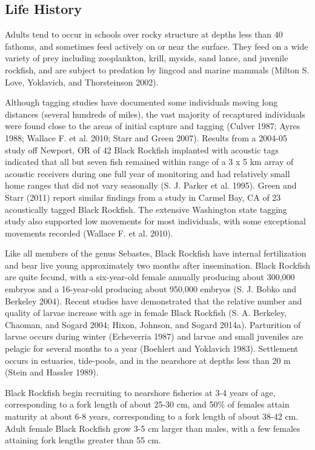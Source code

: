\documentclass[11pt,
  english,
  letterpaper,
]{article}
\begin{document}
\hypertarget{life-history}{%
\subsection{Life History}\label{life-history}}

Adults tend to occur in schools over rocky structure at depths less than 40 fathoms, and sometimes feed actively on or near the surface. They feed on a wide variety of prey including zooplankton, krill, mysids, sand lance, and juvenile rockfish, and are subject to predation by lingcod and marine mammals (Milton S. Love, Yoklavich, and Thorsteinson 2002).

Although tagging studies have documented some individuals moving long distances (several hundreds of miles), the vast majority of recaptured individuals were found close to the areas of initial capture and tagging (Culver 1987; Ayres 1988; Wallace F. et al. 2010; Starr and Green 2007). Results from a 2004-05 study off Newport, OR of 42 Black Rockfish implanted with acoustic tags indicated that all but seven fish remained within range of a 3 x 5 km array of acoustic receivers during one full year of monitoring and had relatively small home ranges that did not vary seasonally (S. J. Parker et al. 1995). Green and Starr (2011) report similar findings from a study in Carmel Bay, CA of 23 acoustically tagged Black Rockfish. The extensive Washington state tagging study also supported low movements for most individuals, with some exceptional movements recorded (Wallace F. et al. 2010).

Like all members of the genus Sebastes, Black Rockfish have internal fertilization and bear live young approximately two months after insemination. Black Rockfish are quite fecund, with a six-year-old female annually producing about 300,000 embryos and a 16-year-old producing about 950,000 embryos (S. J. Bobko and Berkeley 2004). Recent studies have demonstrated that the relative number and quality of larvae increase with age in female Black Rockfish (S. A. Berkeley, Chaoman, and Sogard 2004; Hixon, Johnson, and Sogard 2014a). Parturition of larvae occurs during winter (Echeverria 1987) and larvae and small juveniles are pelagic for several months to a year (Boehlert and Yoklavich 1983). Settlement occurs in estuaries, tide-pools, and in the nearshore at depths less than 20 m (Stein and Hassler 1989).

Black Rockfish begin recruiting to nearshore fisheries at 3-4 years of age, corresponding to a fork length of about 25-30 cm, and 50\% of females attain maturity at about 6-8 years, corresponding to a fork length of about 38-42 cm. Adult female Black Rockfish grow 3-5 cm larger than males, with a few females attaining fork lengths greater than 55 cm.
\end{document}
